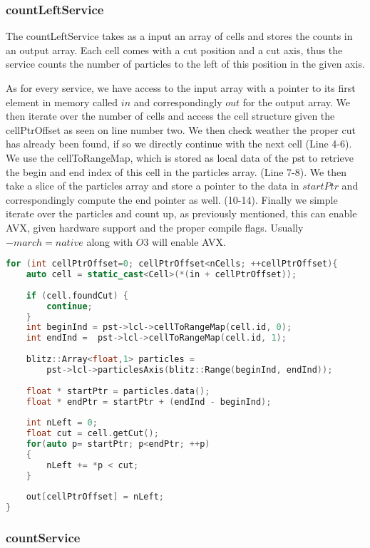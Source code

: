 \documentclass[]{article}
\begin{document}
\subsubsection{countLeftService}

The countLeftService takes as a input an array of cells and stores the counts in an output array. Each cell comes with a cut position and a cut axis, thus the service counts the number of particles to the left of this position in the given axis. 

As for every service, we have access to the input array with a pointer to its first element in memory called $in$ and correspondingly $out$ for the output array. We then iterate over the number of cells and access the cell structure given the cellPtrOffset as seen on line number two.
We then check weather the proper cut has already been found, if so we directly continue with the next cell (Line 4-6). We use the cellToRangeMap, which is stored as local data of the pst to retrieve the begin and end index of this cell in the particles array. (Line 7-8).
We then take a slice of the particles array and store a pointer to the data in $startPtr$ and correspondingly compute the end pointer as well. (10-14).
Finally we simple iterate over the particles and count up, as previously mentioned, this can enable AVX, given hardware support and the proper compile flags. Usually $-march=native$ along with $O3$ will enable AVX. 

\begin{lstlisting}[language=c++]
 for (int cellPtrOffset=0; cellPtrOffset<nCells; ++cellPtrOffset){
	auto cell = static_cast<Cell>(*(in + cellPtrOffset));
	
	if (cell.foundCut) {
		continue;
	}
	int beginInd = pst->lcl->cellToRangeMap(cell.id, 0);
	int endInd =  pst->lcl->cellToRangeMap(cell.id, 1);
	
	blitz::Array<float,1> particles =
		pst->lcl->particlesAxis(blitz::Range(beginInd, endInd));
	
	float * startPtr = particles.data();
	float * endPtr = startPtr + (endInd - beginInd);
	
	int nLeft = 0;
	float cut = cell.getCut();
	for(auto p= startPtr; p<endPtr; ++p)
	{
		nLeft += *p < cut;
	}
	
	out[cellPtrOffset] = nLeft;
}
\end{lstlisting}


\subsubsection{countService}
\end{document}
